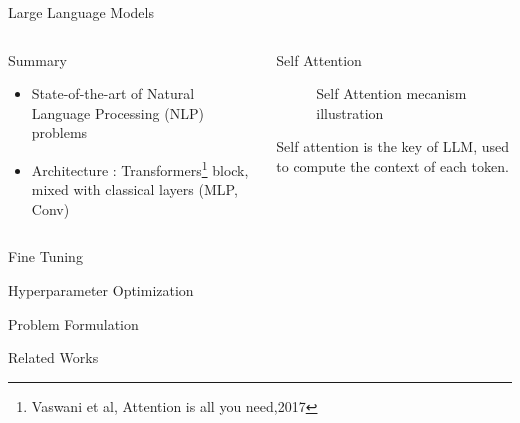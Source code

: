 \begin{frame}{Large Language Models}
   \begin{columns}
         
       \begin{column}[t]{0.4\textwidth}
       \begin{block}{Summary}
       
           \begin{itemize}
               \item State-of-the-art of Natural Language Processing (NLP) problems
               \item Architecture : Transformers\footnote{Vaswani et al, Attention is all you need,2017} block, mixed with classical layers (MLP, Conv)
           \end{itemize}
               
   
       \end{block}
       \end{column}
           
       \begin{column}[t]{0.55\textwidth}
       \begin{block}{Self Attention }
   
           \begin{figure}
               \centering
               
               \caption{Self Attention mecanism illustration}
           \end{figure}
       
           Self attention is the key of LLM, used to compute the context of each token.
       \end{block}  
       \end{column}
            
   \end{columns}
   \end{frame}

\begin{frame}{Fine Tuning}
   
\end{frame}

\begin{frame}{Hyperparameter Optimization}
   
\end{frame}

\begin{frame}{Problem Formulation}
   
\end{frame}

\begin{frame}{Related Works}
   
\end{frame}